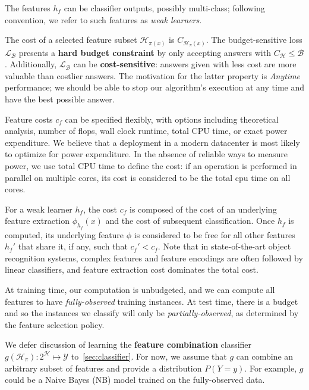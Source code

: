 The features $h_f$ can be classifier outputs, possibly multi-class; following convention, we refer to such features as \emph{weak learners}.

The cost of a selected feature subset $\mathcal{H}_{\pi(x)}$ is $C_{\mathcal{H}_\pi(x)}$.
The budget-sensitive loss $\mathcal{L}_\mathcal{B}$ presents a \textbf{hard budget constraint} by only accepting answers with $C_{\mathcal{H}} \leq \mathcal{B}$.
Additionally, $\mathcal{L}_\mathcal{B}$ can be \textbf{cost-sensitive}: answers given with less cost are more valuable than costlier answers.
The motivation for the latter property is \emph{Anytime} performance; we should be able to stop our algorithm's execution at any time and have the best possible answer.

Feature costs $c_f$ can be specified flexibly, with options including theoretical analysis, number of flops, wall clock runtime, total CPU time, or exact power expenditure.
We believe that a deployment in a modern datacenter is most likely to optimize for power expenditure.
In the absence of reliable ways to measure power, we use total CPU time to define the cost: if an operation is performed in parallel on multiple cores, its cost is considered to be the total cpu time on all cores.

For a weak learner $h_f$, the cost $c_f$ is composed of the cost of an underlying feature extraction $\phi_{h_f}(x)$ and the cost of subsequent classification.
Once $h_f$ is computed, its underlying feature $\phi$ is considered to be free for all other features $h_f'$ that share it, if any, such that $c_f' < c_f$.
Note that in state-of-the-art object recognition systems, complex features and feature encodings are often followed by linear classifiers, and feature extraction cost dominates the total cost.

At training time, our computation is unbudgeted, and we can compute all features to have \emph{fully-observed} training instances.
At test time, there is a budget and so the instances we classify will only be \emph{partially-observed}, as determined by the feature selection policy.

We defer discussion of learning the \textbf{feature combination} classifier $g(\mathcal{H}_\pi) : 2^\mathcal{H} \mapsto \mathcal{Y}$ to~\autoref{sec:classifier}.
For now, we assume that $g$ can combine an arbitrary subset of features and provide a distribution $P(Y = y)$.
For example, $g$ could be a Naive Bayes (NB) model trained on the fully-observed data.



